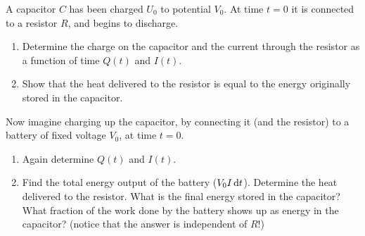 \documentclass[fleqn, a4paper, 11pt, oneside]{amsart}
\theoremstyle{definition}
\theoremstyle{theorem}
\begin{document}
\begin{question}
	A capacitor $C$ has been charged $U_0$ to potential $V_0$.
	At time $t = 0$ it is connected to a resistor $R$, and begins to discharge.
	\begin{figure}[H]
	\end{figure}
	\begin{enumerate}
		\item Determine the charge on the capacitor and the current through the resistor as a function of time $Q(t)$ and $I(t)$.
		\item Show that the heat delivered to the resistor is equal to the energy originally stored in the capacitor.
	\end{enumerate}
	Now imagine charging up the capacitor, by connecting it (and the resistor) to a battery of fixed voltage $V_0$, at time $t = 0$.
	\begin{figure}[H]
	\end{figure}
	\begin{enumerate}[resume]
		\item Again determine $Q(t)$ and $I(t)$.
		\item
			Find the total energy output of the battery ($V_0 I \dif t$).
			Determine the heat delivered to the resistor.
			What is the final energy stored in the capacitor?
			What fraction of the work done by the battery shows up as energy in the capacitor? (notice that the answer is independent of $R$!)
	\end{enumerate}
\end{question}
\end{document}
